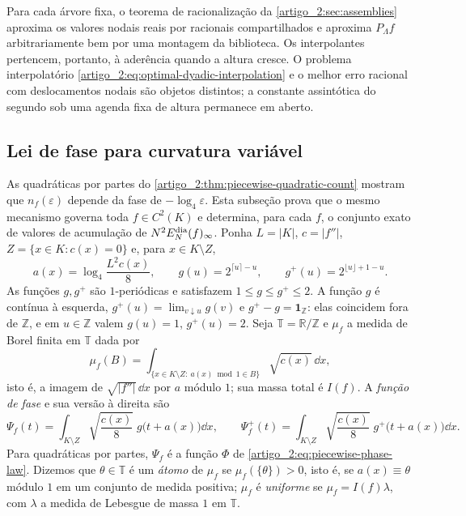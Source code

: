 Para cada árvore fixa, o teorema de racionalização da \cref{artigo_2:sec:assemblies}
aproxima os valores nodais reais por racionais compartilhados e aproxima
$P_\Lambda f$ arbitrariamente bem por uma montagem da biblioteca. Os
interpolantes pertencem, portanto, à aderência quando a altura cresce. O
problema interpolatório \eqref{artigo_2:eq:optimal-dyadic-interpolation} e o melhor
erro racional com deslocamentos nodais são objetos distintos; a constante
assintótica do segundo sob uma agenda fixa de altura permanece em aberto.
\subsection{Lei de fase para curvatura variável}
\label{artigo_2:sec:phase-law}

As quadráticas por partes do \cref{artigo_2:thm:piecewise-quadratic-count} mostram que
$n_f(\varepsilon)$ depende da fase de $-\log_4\varepsilon$. Esta subseção prova que
o mesmo mecanismo governa toda $f\in C^2(K)$ e determina, para cada $f$, o
conjunto exato de valores de acumulação de $N^2E_N^{\rm dia}(f)_\infty$.
Ponha $L=|K|$, $c=|f''|$, $Z=\{x\in K:c(x)=0\}$ e, para $x\in K\setminus Z$,
\begin{equation}
 a(x)=\log_4\frac{L^2c(x)}{8},
 \qquad
 g(u)=2^{\lceil u\rceil-u},
 \qquad
 g^{+}(u)=2^{\lfloor u\rfloor+1-u}.
 \label{artigo_2:eq:phase-kernels}
\end{equation}
As funções $g,g^+$ são $1$-periódicas e satisfazem $1\le g\le g^+\le2$.
A função $g$ é contínua à esquerda, $g^+(u)=\lim_{v\downarrow u}g(v)$ e
$g^+-g=\mathbf 1_{\mathbb Z}$: elas coincidem fora de $\mathbb Z$, e em
$u\in\mathbb Z$ valem $g(u)=1$, $g^+(u)=2$. Seja $\mathbb T=\mathbb R/\mathbb Z$
e $\mu_f$ a medida de Borel finita em $\mathbb T$ dada por
\[
 \mu_f(B)=\int_{\{x\in K\setminus Z:\ a(x)\bmod1\in B\}}\sqrt{c(x)}\,\dd x,
\]
isto é, a imagem de $\sqrt{|f''|}\,\dd x$ por $a$ módulo $1$; sua massa
total é $I(f)$. A \emph{função de fase} e sua versão à direita são
\begin{equation}
 \Psi_f(t)=\int_{K\setminus Z}\sqrt{\frac{c(x)}8}\;g\bigl(t+a(x)\bigr)\dd x,
 \qquad
 \Psi_f^{+}(t)=\int_{K\setminus Z}\sqrt{\frac{c(x)}8}\;g^{+}\bigl(t+a(x)\bigr)\dd x.
 \label{artigo_2:eq:phase-function}
\end{equation}
Para quadráticas por partes, $\Psi_f$ é a função $\Phi$ de
\eqref{artigo_2:eq:piecewise-phase-law}. Dizemos que $\theta\in\mathbb T$ é um
\emph{átomo} de $\mu_f$ se $\mu_f(\{\theta\})>0$, isto é, se $a(x)\equiv\theta$
módulo $1$ em um conjunto de medida positiva; $\mu_f$ é \emph{uniforme} se
$\mu_f=I(f)\lambda$, com $\lambda$ a medida de Lebesgue de massa $1$ em $\mathbb T$.

